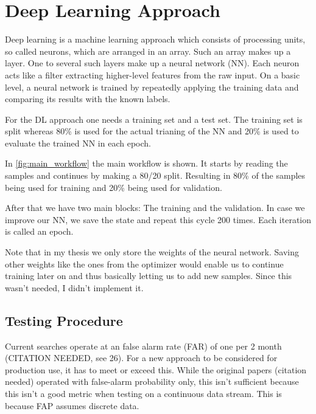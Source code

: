 
\section{Deep Learning Approach}

Deep learning is a machine learning approach which consists of processing
units, so called neurons, which are arranged in an array. Such an array makes up
a layer. One to several such layers make up a neural network (NN). Each neuron
acts like a filter extracting higher-level features from the raw input. On a 
basic level, a neural network is trained by repeatedly applying the training
data and comparing its results with the known labels.

For the DL approach one needs a training set and a test set. The training set
is split whereas 80\% is used for the actual trianing of the NN and 20\% is used
to evaluate the trained NN in each epoch. 



In \autoref{fig:main_workflow} the main workflow is shown. It starts by reading
the samples and continues by making a 80/20 split. Resulting in 80\% of the
samples being used for training and 20\% being used for validation.

After that we have two main blocks: The training and the validation. In case we
improve our NN, we save the state and repeat this cycle 200 times. Each
iteration is called an epoch.

Note that in my thesis we only store the weights of the neural network. Saving
other weights like the ones from the optimizer would enable us to continue
training later on and thus basically letting us to add new samples. Since this
wasn't needed, I didn't implement it.

\subsection{Testing Procedure}
Current searches operate at an false alarm rate (FAR) of one per 2 month
(CITATION NEEDED, see 26). For a new approach to be considered for production
use, it has to meet or exceed this. While the original papers (citation needed)
operated with false-alarm probability only, this isn't sufficient because this
isn't a good metric when testing on a continuous data stream. This is because
FAP assumes discrete data.

